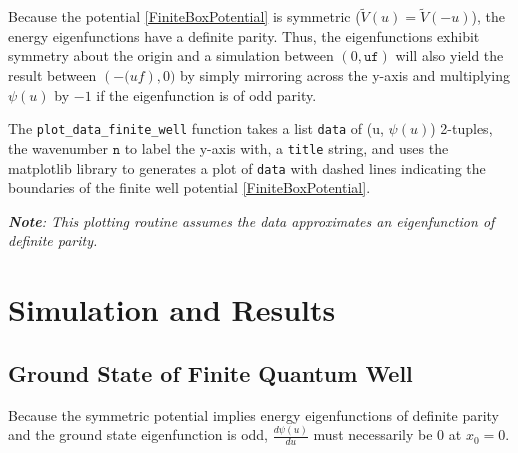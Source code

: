 \documentclass{article}
\begin{document}
Because the potential \eqref{FiniteBoxPotential} is symmetric
($\widetilde{V}(u) = \widetilde{V}(-u)$), the energy eigenfunctions have a
definite parity. Thus, the eigenfunctions exhibit symmetry about the origin and 
a simulation between $(0, \texttt{uf})$ will also yield the result between
$(-\texttt(uf), 0)$ by simply mirroring across the y-axis and multiplying
$\psi(u)$ by $-1$ if the eigenfunction is of odd parity.

The \texttt{plot\_data\_finite\_well} function takes a list \texttt{data} of
(u, $\psi(u)$) 2-tuples, the wavenumber $\texttt{n}$ to label the y-axis with,
a \texttt{title} string, and uses the matplotlib library to generates a plot of
\texttt{data} with dashed lines indicating the boundaries of the finite well
potential
\eqref{FiniteBoxPotential}.

\emph{\textbf{Note}: This plotting routine assumes the data approximates an
eigenfunction of definite parity.}

\section{Simulation and Results}
\subsection{Ground State of Finite Quantum Well} Because the symmetric
potential implies energy eigenfunctions of definite parity and the ground state
eigenfunction is odd, $\frac{d\psi(u)}{du}$ must necessarily be 0 at $x_0 = 0$. 
\end{document}

